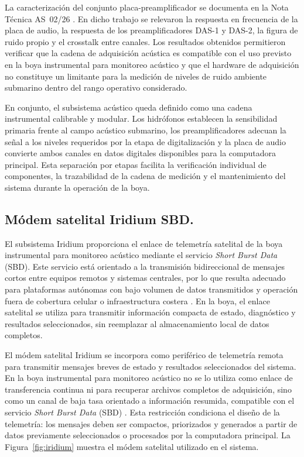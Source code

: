 La caracterización del conjunto placa-preamplificador se documenta en la Nota Técnica AS~02/26 \citep{Cinquini2026_AS0226}. En dicho trabajo se relevaron la respuesta en frecuencia de la placa de audio, la respuesta de los preamplificadores DAS-1 y DAS-2, la figura de ruido propio y el crosstalk entre canales. Los resultados obtenidos permitieron verificar que la cadena de adquisición acústica es compatible con el uso previsto en la boya instrumental para monitoreo acústico y que el hardware de adquisición no constituye un limitante para la medición de niveles de ruido ambiente submarino dentro del rango operativo considerado.

En conjunto, el subsistema acústico queda definido como una cadena instrumental calibrable y modular. Los hidrófonos establecen la sensibilidad primaria frente al campo acústico submarino, los preamplificadores adecuan la señal a los niveles requeridos por la etapa de digitalización y la placa de audio convierte ambos canales en datos digitales disponibles para la computadora principal. Esta separación por etapas facilita la verificación individual de componentes, la trazabilidad de la cadena de medición y el mantenimiento del sistema durante la operación de la boya.

\subsection{Módem satelital Iridium SBD.}

El subsistema Iridium proporciona el enlace de telemetría satelital de la boya instrumental para monitoreo acústico mediante el servicio \textit{Short Burst Data} (SBD). Este servicio está orientado a la transmisión bidireccional de mensajes cortos entre equipos remotos y sistemas centrales, por lo que resulta adecuado para plataformas autónomas con bajo volumen de datos transmitidos y operación fuera de cobertura celular o infraestructura costera \citep{IridiumSBDService}. En la boya, el enlace satelital se utiliza para transmitir información compacta de estado, diagnóstico y resultados seleccionados, sin reemplazar al almacenamiento local de datos completos.

El módem satelital Iridium se incorpora como periférico de telemetría remota para transmitir mensajes breves de estado y resultados seleccionados del sistema. En la boya instrumental para monitoreo acústico no se lo utiliza como enlace de transferencia continua ni para recuperar archivos completos de adquisición, sino como un canal de baja tasa orientado a información resumida, compatible con el servicio \textit{Short Burst Data} (SBD) \citep{Iridium9603NDevGuide}. Esta restricción condiciona el diseño de la telemetría: los mensajes deben ser compactos, priorizados y generados a partir de datos previamente seleccionados o procesados por la computadora principal. La Figura~\ref{fig:iridium} muestra el módem satelital utilizado en el sistema.

